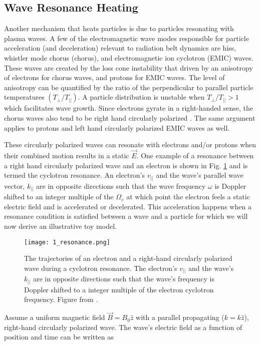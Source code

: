 \subsection{Wave Resonance Heating}\label{Intro:wave_heating}
Another mechanism that heats particles is due to particles resonating with plasma waves. A few of the electromagnetic wave modes responsible for particle acceleration (and deceleration) relevant to radiation belt dynamics are hiss, whistler mode chorus (chorus), and electromagnetic ion cyclotron (EMIC) waves. These waves are created by the loss cone instability that driven by an anisotropy of electrons for chorus waves, and protons for EMIC waves. The level of anisotropy can be quantified by the ratio of the perpendicular to parallel particle temperatures $(T_\perp/T_{||})$. A particle distribution is unstable when $T_\perp/T_{||} > 1$ which facilitates wave growth. Since electrons gyrate in a right-handed sense, the chorus waves also tend to be right hand circularly polarized \citep{Tsurutani1997}. The same argument applies to protons and left hand circularly polarized EMIC waves as well. 

These circularly polarized waves can resonate with electrons and/or protons when their combined motion results in a static $\vec{E}$. One example of a resonance between a right hand circularly polarized wave and an electron is shown in Fig. \ref{Intro:resonance} and is termed the cyclotron resonance. An electron's $v_{||}$ and the wave's parallel wave vector, $k_{||}$ are in opposite directions such that the wave frequency $\omega$ is Doppler shifted to an integer multiple of the $\Omega_e$ at which point the electron feels a static electric field and is accelerated or decelerated. This acceleration happens when a resonance condition is satisfied between a wave and a particle for which we will now derive an illustrative toy model.

\begin{figure}
\texttt{[image: 1\_resonance.png]}
\caption{The trajectories of an electron and a right-hand circularly polarized wave during a cyclotron resonance. The electron's $v_{||}$ and the wave's $k_{||}$ are in opposite directions such that the wave's frequency is Doppler shifted to a integer multiple of the electron cyclotron frequency. Figure from \citep{Tsurutani1997}.}
\label{Intro:resonance}
\end{figure}

Assume a uniform magnetic field $\vec{B} = B_0 \hat{z}$ with a parallel propagating ($k = k\hat{z}$), right-hand circularly polarized wave. The wave's electric field as a function of position and time can be written as

